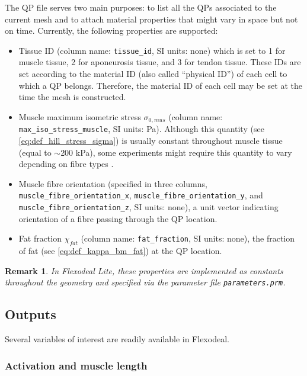 \documentclass{sfuthesis}
\numberwithin{equation}{section}
\numberwithin{figure}{chapter}
\numberwithin{table}{chapter}
\newtheorem{remark}[theorem]{Remark}
\theoremstyle{definition}
\begin{document}
The QP file serves two main purposes: to list all the QPs associated to the current mesh and to attach material properties that might vary in space but not on time. Currently, the following properties are supported:
\begin{itemize}
    \item Tissue ID (column name: \texttt{tissue\_id}, SI units: none) which is set to 1 for muscle tissue, 2 for aponeurosis tissue, and 3 for tendon tissue. These IDs are set according to the material ID (also called ``physical ID'') of each cell to which a QP belongs. Therefore, the material ID of each cell may be set at the time the mesh is constructed.
    \item Muscle maximum isometric stress $\sigma_{0,mus}$ (column name: \texttt{max\_iso\_stress\_muscle}, SI units: Pa). Although this quantity (see \eqref{eq:def_hill_stress_sigma}) is usually constant throughout muscle tissue (equal to $\sim$200 kPa), some experiments might require this quantity to vary depending on fibre types \cite{Bottinelli1999}.
    \item Muscle fibre orientation (specified in three columns, \texttt{muscle\_fibre\_orientation\_x}, \texttt{muscle\_fibre\_orientation\_y}, and \texttt{muscle\_fibre\_orientation\_z}, SI units: none), a unit vector indicating orientation of a fibre passing through the QP location.
    \item Fat fraction $\chi_{fat}$ (column name: \texttt{fat\_fraction}, SI units: none), the fraction of fat (see \eqref{eq:def_kappa_bm_fat}) at the QP location.
\end{itemize}

\begin{remark}
    In Flexodeal Lite, these properties are implemented as constants throughout the geometry and specified via the parameter file \texttt{parameters.prm}.
\end{remark}

\subsection{Outputs} \label{sec:flexodeal_outputs}

Several variables of interest are readily available in Flexodeal.

\subsubsection{Activation and muscle length}
\end{document}
